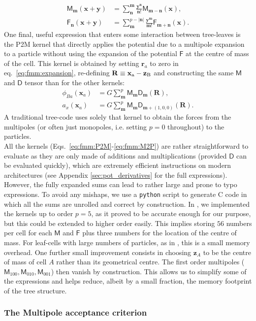 \begin{align}
  \mathsf{M}_{\mathbf{m}}(\mathbf{x} + \mathbf{y}) &=
  \sum_{\mathbf{n}}^{\mathbf{m}}
  \frac{\mathbf{y}^\mathbf{n}}{\mathbf{n}!}\mathsf{M}_{\mathbf{m} -
    \mathbf{n}}(\mathbf{x}), \label{eq:fmm:M2M} \\
  \mathsf{F}_{\mathbf{n}}(\mathbf{x} + \mathbf{y}) &=
  \sum_{\mathbf{m}}^{p-|\mathbf{n}|}
  \frac{\mathbf{y}^\mathbf{m}}{\mathbf{m}!}\mathsf{F}_{\mathbf{m} +
    \mathbf{n}}(\mathbf{x}). \label{eq:fmm:L2L} 
\end{align}
One final, useful expression that enters some interaction between
tree-leaves is the P2M kernel that directly applies the potential due
to a multipole expansion to a particle without using the expansion of
the potential $\mathsf{F}$ at the centre of mass of the cell. This
kernel is obtained by setting $\mathbf{r}_a$ to zero in
eq.~\ref{eq:fmm:expansion}, re-defining
$\mathbf{R}\equiv\mathbf{x}_{\rm a} - \mathbf{z}_{\rm B}$ and
constructing the same $\mathsf{M}$ and $\mathsf{D}$ tensor than for
the other kernels:
\begin{align}
  \phi_{Ba}(\mathbf{x}_a) &= G\sum_{\mathbf{m}}^p \mathsf{M}_{\mathbf{m}} \mathsf{D}_{\mathbf{m}}(\mathbf{R}),\\
  a_x(\mathbf{x}_a) &= G\sum_{\mathbf{m}}^p \mathsf{M}_{\mathbf{m}} \mathsf{D}_{\mathbf{m}+\left(1,0,0\right)}(\mathbf{R}).
  \label{eq:fmm:M2P}
\end{align}
A traditional tree-code uses solely that kernel to obtain the forces
from the multipoles (or often just monopoles, i.e. setting $p=0$ throughout)
to the particles.\\
All the kernels (Eqs.~\ref{eq:fmm:P2M}-\ref{eq:fmm:M2P}) are rather
straightforward to evaluate as they are only made of additions and
multiplications (provided $\mathsf{D}$ can be evaluated quickly),
which are extremely efficient instructions on modern architectures
(see Appendix \ref{sec:pot_derivatives} for the full
expressions). However, the fully expanded sums can lead to rather
large and prone to typo expressions. To avoid any mishaps, we use a
\texttt{python} script to generate C code in which all the sums are
unrolled and correct by construction. In \swift, we implemented the
kernels up to order $p=5$, as it proved to be accurate enough for our
purpose, but this could be extended to higher order easily. This
implies storing $56$ numbers per cell for each $\textsf{M}$ and
$\textsf{F}$ plus three numbers for the location of the centre of
mass. For leaf-cells with large numbers of particles, as in \swift,
this is a small memory overhead. One further small improvement
consists in choosing $\mathbf{z}_A$ to be the centre of mass of cell
$A$ rather than its geometrical centre. The first order multipoles
($\mathsf{M}_{100},\mathsf{M}_{010},\mathsf{M}_{001}$) then vanish by
construction. This allows us to simplify some of the expressions and
helps reduce, albeit by a small fraction, the memory footprint of the
tree structure.

\subsubsection{The Multipole acceptance criterion}
